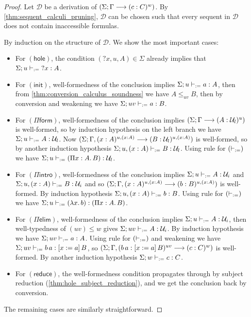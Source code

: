 \documentclass[twoside]{report}
\begin{document}
\begin{proof}
Let $\mathcal D$ be a derivation of $(\Sigma; \Gamma \longrightarrow (c : C)^w)$. By \cref{thm:sequent_calculi_pruning}, $\mathcal D$ can be chosen such that every sequent in $\mathcal D$ does not contain inaccessible formulas.

By induction on the structure of $\mathcal D$. We show the most important cases:

\begin{itemize}
    \item For $(\mathsf{hole})$, the condition $({?x}, u, A) \in \Sigma$ already implies that $\Sigma; u \vdash_{:=} {?x} : A$.
    
    \item For $(\mathsf{init})$, well-formedness of the conclusion implies $\Sigma; u \vdash_{:=} a : A$, then from \cref{thm:conversion_calculus_soundness} we have $A \leq_{uv} B$, then by conversion and weakening we have $\Sigma; uv \vdash_{:=} a : B$.

    \item For $(\Pi\mathsf{form})$, well-formedness of the conclusion implies $(\Sigma; \Gamma \longrightarrow (A : \mathcal U_l)^u)$ is well-formed, so by induction hypothesis on the left branch we have $\Sigma; u \vdash_{:=} A : \mathcal U_l$. Now $(\Sigma; \Gamma, (x : A)^{u, (x : A)} \longrightarrow (B : \mathcal U_l)^{u, (x : A)})$ is well-formed, so by another induction hypothesis $\Sigma; u, (x : A) \vdash_{:=} B : \mathcal U_l$. Using rule for $(\vdash_{:=})$ we have $\Sigma; u \vdash_{:=} (\Pi{x} : {A}.\,{B}) : \mathcal U_l$.

    \item For $(\Pi\mathsf{intro})$, well-formedness of the conclusion implies $\Sigma; u \vdash_{:=} A : \mathcal U_i$ and $\Sigma; u, (x : A) \vdash_{:=} B : \mathcal U_i$ and so $(\Sigma; \Gamma, (x : A)^{u, (x : A)} \longrightarrow (b : B)^{u, (x : A)})$ is well-formed. By induction hypothesis $\Sigma; u, (x : A) \vdash_{:=} b : B$. Using rule for $(\vdash_{:=})$ we have $\Sigma; u \vdash_{:=} (\lambda{x}.\,{b}) : (\Pi{x} : {A}.\,{B})$.

    \item For $(\Pi\mathsf{elim})$, well-formedness of the conclusion implies $\Sigma; u \vdash_{:=} A : \mathcal U_i$, then well-typedness of $(uv) \leq w$ gives $\Sigma; uv \vdash_{:=} A : \mathcal U_i$. By induction hypothesis we have $\Sigma; uv \vdash_{:=} a : A$. Using rule for $(\vdash_{:=})$ and weakening we have $\Sigma; uv \vdash_{:=} {b}\,{a} : [{x}:={a}]\,{B}$, so $(\Sigma; \Gamma, ({b}\,{a} : [{x}:={a}]\,{B})^{uv} \longrightarrow (c : C)^w)$ is well-formed. By another induction hypothesis $\Sigma; w \vdash_{:=} c : C$.

    \item For $(\mathsf{reduce})$, the well-formedness condition propagates through by subject reduction (\cref{thm:hole_subject_reduction}), and we get the conclusion back by conversion.
\end{itemize}

The remaining cases are similarly straightforward.
\end{proof}
\end{document}
